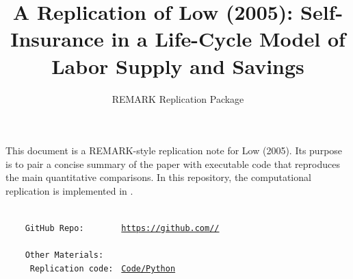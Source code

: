 \documentclass[titlepage, headings=optiontotocandhead]{econark} %
\begin{document}
\webonly{
  \newcommand{\versn}{Web}
}

\title{A Replication of Low (2005): Self-Insurance in a Life-Cycle Model of Labor Supply and Savings}

\author{REMARK Replication Package}



\date{}

\maketitle
\vspace{-0.5\baselineskip}

\whenintegrated{\label{abstract}} %
\begin{abstract}
  \AbstractText
\end{abstract}
\vspace{-0.5\baselineskip}

This document is a REMARK-style replication note for Low (2005). Its purpose is to pair a
concise summary of the paper with executable code that reproduces the main quantitative
comparisons. In this repository, the computational replication is implemented in
.

\whenintegrated{\label{links}} %

\providecommand{\REMARK}{\href{https://github.com/econ-ark/REMARK}{REMARK}}
\begin{footnotesize}
  \setlength{\parskip}{0pt}
  \parbox{0.9\textwidth}{
    \begin{tabbing}
      \texttt{~~~~~~~~~~~~~~~~~~~~~~~} \= \=  \\
      \texttt{~~~~GitHub~Repo:~~~~~~~} \> \> \texttt{\href{https://github.com/\owner/\projectname}{https://github.com/\owner/\projectname}} \\
      \texttt{~~~~~~~~~~~~~~~~~~~~~~~} \> \>  \\
      \texttt{~~~~Other~Materials:~~~} \> \> \\
      \texttt{~~~~~Replication~code:~} \> \> \texttt{\href{https://github.com/\owner/\projectname/tree/main/Code/Python}{Code/Python}} \\
    \end{tabbing}
  }
\end{footnotesize}
\vspace{-0.3\baselineskip}
\end{document}
